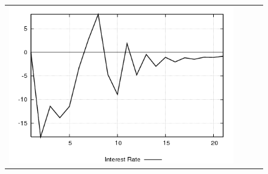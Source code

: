 \begin{figure}
\begin{tabular}{cccc}
\includegraphics[scale=0.22]{results_wlsinit/Interest_Rate_invshock_irf.png} \\ 
\end{tabular}
\end{figure}
